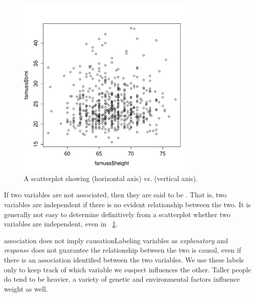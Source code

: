 \begin{doublespace}
\begin{figure}
\centering
\includegraphics[width=0.8\textwidth]
{ch_intro_to_data_oi_biostat/figures/famussHeightVsBmi/famussHeightVsBmi.pdf}
\caption{A scatterplot showing  (horizontal axis) vs.   (vertical axis).} 
\label{famuss_height_bmi}
\end{figure}

If two variables are not associated, then they are said to be . That is, two variables are independent if there is no evident relationship between the two.  It is generally not easy to determine definitively from a scatterplot whether two variables are independent, even in ~\ref{famuss_height_bmi}.

\begin{caution}{association does not imply causation}{Labeling variables as \emph{explanatory} and \emph{response} does not guarantee the relationship between the two is causal, even if there is an association identified between the two variables. We use these labels only to keep track of which variable we suspect influences the other.  Taller people do tend to be heavier, a variety of genetic and environmental factors influence weight as well.}
\end{caution}

\end{doublespace}
